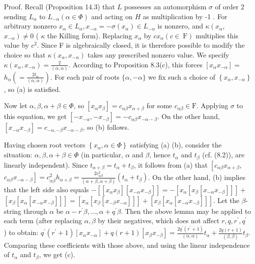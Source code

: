 \documentclass[10pt]{article}
\begin{document}
Proof. Recall (Proposition 14.3) that $L$ possesses an automorphism $\sigma$ of order 2 sending $L_{\alpha}$ to $L_{-\alpha}(\alpha \in \Phi)$ and acting on $H$ as multiplication by -1 . For arbitrary nonzero $x_{\alpha} \in L_{\alpha}, x_{-\alpha}=-\sigma\left(x_{\alpha}\right) \in L_{-\alpha}$ is nonzero, and $\kappa\left(x_{\alpha}\right.$, $\left.x_{-\alpha}\right) \neq 0$ ( $\kappa$ the Killing form). Replacing $x_{\alpha}$ by $c x_{\alpha}(c \in \mathrm{~F})$ multiplies this value by $c^{2}$. Since F is algebraically closed, it is therefore possible to modify the choice so that $\kappa\left(x_{\alpha}, x_{-\alpha}\right)$ takes any prescribed nonzero value. We specify $\kappa\left(x_{\alpha}, x_{-\alpha}\right)=\frac{2}{(\alpha, \alpha)}$. According to Proposition 8.3(c), this forces $\left[x_{\alpha} x_{-\alpha}\right]=$ $h_{\alpha}\left(=\frac{2 t_{\alpha}}{(\alpha, \alpha)}\right)$. For each pair of roots $\{\alpha,-\alpha\}$ we fix such a choice of $\left\{x_{\alpha}, x_{-\alpha}\right\}$, so (a) is satisfied.

Now let $\alpha, \beta, \alpha+\beta \in \Phi$, so $\left[x_{\alpha} x_{\beta}\right]=c_{\alpha \beta} x_{\alpha+\beta}$ for some $c_{\alpha \beta} \in \mathrm{F}$. Applying $\sigma$ to this equation, we get $\left[-x_{-\alpha},-x_{-\beta}\right]=-c_{\alpha \beta} x_{-\alpha-\beta}$. On the other hand, $\left[x_{-\alpha} x_{-\beta}\right]=c_{-\alpha,-\beta} x_{-\alpha-\beta}$, so (b) follows.

Having chosen root vectors $\left\{x_{\alpha}, \alpha \in \Phi\right\}$ satisfying (a) (b), consider the situation: $\alpha, \beta, \alpha+\beta \in \Phi$ (in particular, $\alpha$ and $\beta$, hence $t_{\alpha}$ and $t_{\beta}$ (cf. (8.2)), are linearly independent). Since $t_{\alpha+\beta}=t_{\alpha}+t_{\beta}$, it follows from (a) that $\left[c_{\alpha \beta} x_{\alpha+\beta}\right.$, $\left.c_{\alpha \beta} x_{-\alpha-\beta}\right]=c_{\alpha \beta}^{2} h_{\alpha+\beta}=\frac{2 c_{\alpha \beta}^{2}}{(\alpha+\beta, \alpha+\beta)}\left(t_{\alpha}+t_{\beta}\right)$. On the other hand, (b) implies that the left side also equals $-\left[\left[x_{\alpha} x_{\beta}\right]\left[x_{-\alpha} x_{-\beta}\right]\right]=-\left[x_{\alpha}\left[x_{\beta}\left[x_{-\alpha} x_{-\beta}\right]\right]\right]+$ $\left[x_{\beta}\left[x_{\alpha}\left[x_{-\alpha} x_{-\beta}\right]\right]\right]=\left[x_{\alpha}\left[x_{\beta}\left[x_{-\beta} x_{-\alpha}\right]\right]\right]+\left[x_{\beta}\left[x_{\alpha}\left[x_{-\alpha} x_{-\beta}\right]\right]\right]$. Let the $\beta$-string through $\alpha$ be $\alpha-r^{\prime} \beta, \ldots, \alpha+q^{\prime} \beta$. Then the above lemma may be applied to each term (after replacing $\alpha, \beta$ by their negatives, which does not affect $r, q, r^{\prime}, q^{\prime}$ ) to obtain: $q^{\prime}\left(r^{\prime}+1\right)\left[x_{\alpha} x_{-\alpha}\right]+q(r+1)\left[x_{\beta} x_{-\beta}\right]=\frac{2 q^{\prime}\left(r^{\prime}+1\right)}{(\alpha, \alpha)} t_{\alpha}+\frac{2 q(r+1)}{(\beta, \beta)} t_{\beta}$. Comparing these coefficients with those above, and using the linear independence of $t_{\alpha}$ and $t_{\beta}$, we get (c).
\end{document}
